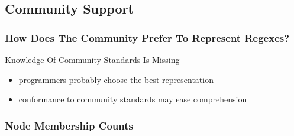 \subsection{Community Support}

{
\begin{frame}
\frametitle{How Does The Community Prefer To Represent Regexes?}
\begin{block}{\begin{Large}Knowledge Of Community Standards Is Missing\end{Large}}
\begin{itemize}
\item \begin{large}programmers probably choose the best representation\end{large}
\item \begin{large}conformance to community standards may ease comprehension\end{large}
\end{itemize}
\end{block}
\end{frame}
}



\begin{frame}
\frametitle{Node Membership Counts}

\end{frame}

